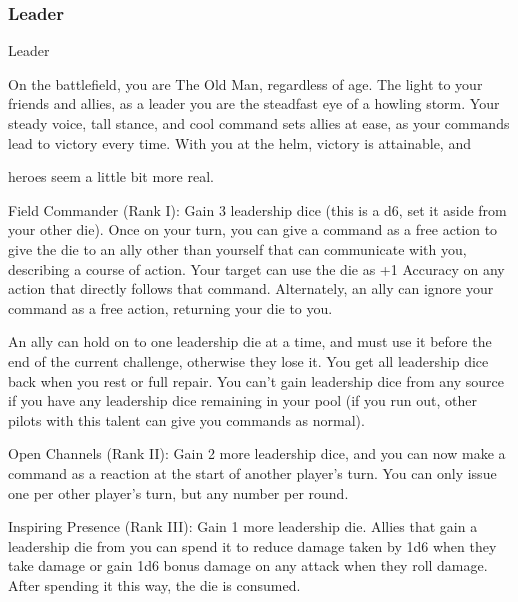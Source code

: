 \subsubsection{Leader}

                                                    Leader

On the battlefield, you are The Old Man, regardless of age. The light to your friends and allies, as a leader
you are the steadfast eye of a howling storm. Your steady voice, tall stance, and cool command sets allies
at ease, as your commands lead to victory every time. With you at the helm, victory is attainable, and

heroes seem a little bit more real.




Field Commander (Rank I): Gain 3 leadership dice (this is a d6, set it aside from your other die).
Once on your turn, you can give a command as a free action to give the die to an ally other than
yourself that can communicate with you, describing a course of action. Your target can use the
die as +1 Accuracy on any action that directly follows that command. Alternately, an ally can
ignore your command as a free action, returning your die to you.

An ally can hold on to one leadership die at a time, and must use it before the end of the current
challenge, otherwise they lose it. You get all leadership dice back when you rest or full repair. You
can’t gain leadership dice from any source if you have any leadership dice remaining in your pool
(if you run out, other pilots with this talent can give you commands as normal).

Open Channels (Rank II): Gain 2 more leadership dice, and you can now make a command as a
reaction at the start of another player’s turn. You can only issue one per other player’s turn, but
any number per round.

Inspiring Presence (Rank III): Gain 1 more leadership die. Allies that gain a leadership die from
you can spend it to reduce damage taken by 1d6 when they take damage or gain 1d6 bonus
damage on any attack when they roll damage. After spending it this way, the die is consumed.
